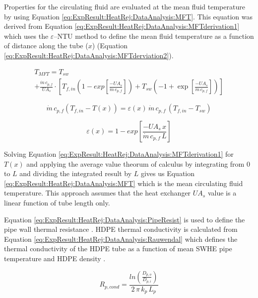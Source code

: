 Properties for the circulating fluid are evaluated at the mean fluid temperature by using Equation \ref{eq:ExpResult:HeatRej:DataAnalysis:MFT}. This equation was derived from Equation \ref{eq:ExpResult:HeatRej:DataAnalysis:MFTderivation1} which uses the $\varepsilon$--NTU method to define the mean fluid temperature as a function of distance along the tube ($x$) (Equation \ref{eq:ExpResult:HeatRej:DataAnalysis:MFTderviation2}).
	
	\begin{multline}
		T_{MFT}=T_{sw}\\+\frac{\dot{m} \, c_{p,f}}{UA_s} \cdot \left[T_{f,in}\left(1-exp\left[\frac{-UA_s}{\dot{m} \, c_{p,f}}\right]\right) + T_{sw} \left(-1+\exp\left[\frac{-UA_s}{\dot{m} \, c_{p,f}}\right]\right)\right]
		\label{eq:ExpResult:HeatRej:DataAnalysis:MFT}
	\end{multline}
	
	\begin{equation}
		\dot{m} \, c_{p,f} (T_{f,in}-T(x)) = \varepsilon(x) \, \dot{m} \, c_{p,f} \, (T_{f,in}-T_{sw})
		\label{eq:ExpResult:HeatRej:DataAnalysis:MFTderivation1}
	\end{equation}
	
	\begin{equation}
		\varepsilon(x) = 1-exp\left[\frac{-UA_s \, x}{\dot{m} \, c_{p,f} \, L}\right]
		\label{eq:ExpResult:HeatRej:DataAnalysis:MFTderviation2}
	\end{equation}
	
Solving Equation \ref{eq:ExpResult:HeatRej:DataAnalysis:MFTderivation1} for $T(x)$ and applying the average value theorum of calculus by integrating from $0$ to $L$ and dividing the integrated result by $L$ gives us Equation \ref{eq:ExpResult:HeatRej:DataAnalysis:MFT} which is the mean circulating fluid temperature. This approach assumes that the heat exchanger $U A_s$ value is a linear function of tube length only.

Equation \ref{eq:ExpResult:HeatRej:DataAnalysis:PipeResist} is used to define the pipe wall thermal resistance \citep{CengelGhajar2011}. HDPE thermal conductivity is calculated from Equation \ref{eq:ExpResult:HeatRej:DataAnalysis:Rauwendal} which defines the thermal conductivity of the HDPE tube as a function of mean SWHE pipe temperature and HDPE density \citep{Rauwendaal1986}. 

	\begin{equation}
		R_{p,cond}=\frac{ln\left(\frac{D_{p,o}}{D_{p,i}}\right)}{2 \, \pi \, k_p \, L_{p}}
		\label{eq:ExpResult:HeatRej:DataAnalysis:PipeResist}
	\end{equation}

